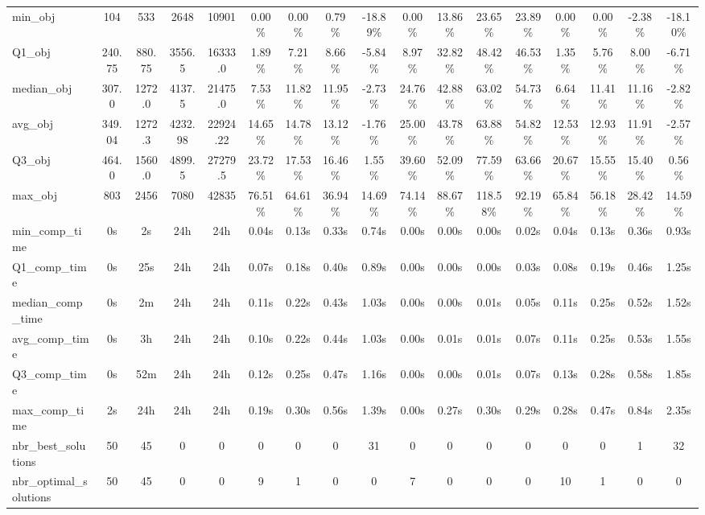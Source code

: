 \begin{tabular}{lcccccccccccccccc}
min_obj & 104 & 533 & 2648 & 10901 & 0.00\% & 0.00\% & 0.79\% & -18.89\% & 0.00\% & 13.86\% & 23.65\% & 23.89\% & 0.00\% & 0.00\% & -2.38\% & -18.10\% \\
Q1_obj & 240.75 & 880.75 & 3556.5 & 16333.0 & 1.89\% & 7.21\% & 8.66\% & -5.84\% & 8.97\% & 32.82\% & 48.42\% & 46.53\% & 1.35\% & 5.76\% & 8.00\% & -6.71\% \\
median_obj & 307.0 & 1272.0 & 4137.5 & 21475.0 & 7.53\% & 11.82\% & 11.95\% & -2.73\% & 24.76\% & 42.88\% & 63.02\% & 54.73\% & 6.64\% & 11.41\% & 11.16\% & -2.82\% \\
avg_obj & 349.04 & 1272.3 & 4232.98 & 22924.22 & 14.65\% & 14.78\% & 13.12\% & -1.76\% & 25.00\% & 43.78\% & 63.88\% & 54.82\% & 12.53\% & 12.93\% & 11.91\% & -2.57\% \\
Q3_obj & 464.0 & 1560.0 & 4899.5 & 27279.5 & 23.72\% & 17.53\% & 16.46\% & 1.55\% & 39.60\% & 52.09\% & 77.59\% & 63.66\% & 20.67\% & 15.55\% & 15.40\% & 0.56\% \\
max_obj & 803 & 2456 & 7080 & 42835 & 76.51\% & 64.61\% & 36.94\% & 14.69\% & 74.14\% & 88.67\% & 118.58\% & 92.19\% & 65.84\% & 56.18\% & 28.42\% & 14.59\% \\
min_comp_time & 0s & 2s & 24h & 24h & 0.04s & 0.13s & 0.33s & 0.74s & 0.00s & 0.00s & 0.00s & 0.02s & 0.04s & 0.13s & 0.36s & 0.93s \\
Q1_comp_time & 0s & 25s & 24h & 24h & 0.07s & 0.18s & 0.40s & 0.89s & 0.00s & 0.00s & 0.00s & 0.03s & 0.08s & 0.19s & 0.46s & 1.25s \\
median_comp_time & 0s & 2m & 24h & 24h & 0.11s & 0.22s & 0.43s & 1.03s & 0.00s & 0.00s & 0.01s & 0.05s & 0.11s & 0.25s & 0.52s & 1.52s \\
avg_comp_time & 0s & 3h & 24h & 24h & 0.10s & 0.22s & 0.44s & 1.03s & 0.00s & 0.01s & 0.01s & 0.07s & 0.11s & 0.25s & 0.53s & 1.55s \\
Q3_comp_time & 0s & 52m & 24h & 24h & 0.12s & 0.25s & 0.47s & 1.16s & 0.00s & 0.00s & 0.01s & 0.07s & 0.13s & 0.28s & 0.58s & 1.85s \\
max_comp_time & 2s & 24h & 24h & 24h & 0.19s & 0.30s & 0.56s & 1.39s & 0.00s & 0.27s & 0.30s & 0.29s & 0.28s & 0.47s & 0.84s & 2.35s \\
nbr_best_solutions & 50 & 45 & 0 & 0 & 0 & 0 & 0 & 31 & 0 & 0 & 0 & 0 & 0 & 0 & 1 & 32 \\
nbr_optimal_solutions & 50 & 45 & 0 & 0 & 9 & 1 & 0 & 0 & 7 & 0 & 0 & 0 & 10 & 1 & 0 & 0 \\
\bottomrule
\end{tabular}
